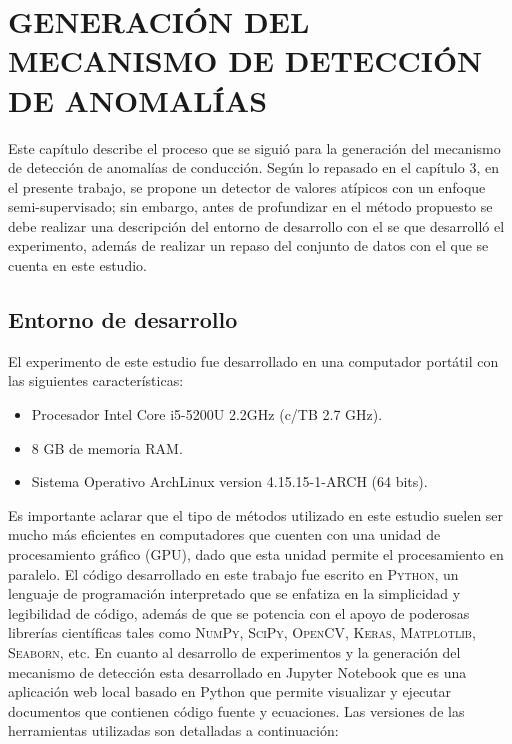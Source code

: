 \chapter{\uppercase{Generaci\'{o}n del mecanismo de detecci\'{o}n de anomal\'{i}as}}
\label{Capitulo 5}

Este cap\'{i}tulo describe el proceso que se sigui\'{o} para la generaci\'{o}n del mecanismo de detecci\'{o}n de anomal\'{i}as de conducci\'{o}n. Seg\'{u}n lo repasado en el cap\'{i}tulo 3, en el presente trabajo, se propone un detector de valores at\'{i}picos con un enfoque semi-supervisado; sin embargo, antes de profundizar en el m\'{e}todo propuesto se debe realizar una descripci\'{o}n del entorno de desarrollo con el se que desarroll\'{o} el experimento, adem\'{a}s de realizar un repaso del conjunto de datos con el que se cuenta en este estudio.

\section{Entorno de desarrollo}

El experimento de este estudio fue desarrollado en una computador port\'{a}til con las siguientes caracter\'{i}sticas:

\begin{itemize}
\item Procesador Intel Core i5-5200U 2.2GHz (c/TB 2.7 GHz).
\item 8 GB de memoria RAM.
\item Sistema Operativo ArchLinux version 4.15.15-1-ARCH (64 bits). 
\end{itemize}

Es importante aclarar que el tipo de m\'{e}todos utilizado en este estudio suelen ser mucho m\'{a}s eficientes en computadores que cuenten con una unidad de procesamiento gr\'{a}fico (GPU), dado que esta unidad permite el procesamiento en paralelo. El c\'{o}digo desarrollado en este trabajo fue escrito en \textsc{Python}, un lenguaje de programaci\'{o}n interpretado que se enfatiza en la simplicidad y legibilidad de c\'{o}digo, adem\'{a}s de que se potencia con el apoyo de poderosas librer\'{i}as cient\'{i}ficas tales como \textsc{NumPy}, \textsc{SciPy}, \textsc{OpenCV}, \textsc{Keras}, \textsc{Matplotlib}, \textsc{Seaborn}, etc. En cuanto al desarrollo de experimentos y la generaci\'{o}n del mecanismo de detecci\'{o}n esta desarrollado en Jupyter Notebook que es una aplicaci\'{o}n web local basado en Python que permite visualizar y ejecutar documentos que contienen c\'{o}digo fuente y ecuaciones. Las versiones de las herramientas utilizadas son detalladas a continuaci\'{o}n:

